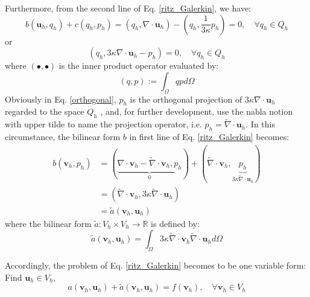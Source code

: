 Furthermore, from the second line of Eq. \eqref{ritz_Galerkin}, we have:
\begin{equation}
    b(\boldsymbol u_h, q_h) + c(q_h, p_h) = 
    (q_h, \nabla \cdot \boldsymbol u_h) - (q_h, \frac{1}{3\kappa} p_h) = 0
    ,\quad \forall q_h \in Q_h
\end{equation}
or
\begin{equation}\label{orthogonal}
    (q_h, 3\kappa \nabla \cdot \boldsymbol u_h - p_h) = 0
    ,\quad \forall q_h \in Q_h
\end{equation}
where $(\bullet, \bullet)$ is the inner product operator evaluated by:
\begin{equation}
    (q,p) := \int_\Omega qp d\Omega
\end{equation}
Obviously in Eq. \eqref{orthogonal},
$p_h$ is the orthogonal projection of $3\kappa \nabla \cdot \boldsymbol u_h$ regarded to the space $Q_h$ \cite{brezzi1991a},
and, for further development, use the nabla notion with upper tilde to name the projection operator, i.e. $p_h = \tilde \nabla \cdot \boldsymbol u_h$.
In this circumstance, the bilinear form $b$ in first line of Eq. \eqref{ritz_Galerkin} becomes:
\begin{equation}
    \begin{split}
        b(\boldsymbol v_h, p_h) &= (
            \underbrace{
            \nabla \cdot \boldsymbol v_h - \tilde \nabla \cdot \boldsymbol v_h, p_h
            }_{0}
        ) + (\tilde \nabla \cdot \boldsymbol v_h, \underbrace{p_h}_{3\kappa\tilde \nabla \cdot \boldsymbol u_h}) \\
        &= 
        (\tilde \nabla \cdot \boldsymbol v_h, 3\kappa\tilde \nabla \cdot \boldsymbol u_h) \\
        &= \tilde a(\boldsymbol v_h, \boldsymbol u_h)
    \end{split}
\end{equation}
where the bilinear form $\tilde a: V_h \times V_h \rightarrow \mathbb R$ is defined by:
\begin{equation}
    \tilde a(\boldsymbol v_h, \boldsymbol u_h) =
    \int_\Omega 3\kappa \tilde \nabla \cdot \boldsymbol v_h \tilde \nabla \cdot \boldsymbol u_h d\Omega
\end{equation}

Accordingly, the problem of Eq. \eqref{ritz_Galerkin} becomes to be one variable form:
Find $\boldsymbol u_h \in V_h$,
\begin{equation}\label{weak_penalty}
    a(\boldsymbol v_h, \boldsymbol u_h) + \tilde a(\boldsymbol v_h, \boldsymbol u_h) = f(\boldsymbol v_h)
    , \quad \forall \boldsymbol v_h \in V_h
\end{equation}

